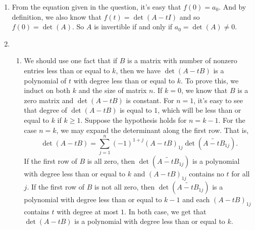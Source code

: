 \begin{enumerate}
\item From the equation given in the question, it's easy that $f(0)=a_0$. And by definition, we also know that $f(t)=\det(A-tI)$ and so $f(0)=\det(A)$. So $A$ is invertible if and only if $a_0=\det(A)\neq 0$.
\item \begin{enumerate}
\item We should use one fact that if $B$ is a matrix with number of nonzero entries less than or equal to $k$, then we have $\det(A-tB)$ is a polynomial of $t$ with degree less than or equal to $k$. To prove this, we induct on both $k$ and the size of matrix $n$. If $k=0$, we know that $B$ is a zero matrix and $\det(A-tB)$ is constant. For $n=1$, it's easy to see that degree of $\det(A-tB)$ is equal to $1$, which will be less than or equal to $k$ if $k\geq 1$. Suppose the hypothesis holds for $n=k-1$. For the case $n=k$, we may expand the determinant along the first row. That is,
\[\det(A-tB)=\sum_{j=1}^n{(-1)^{1+j}(A-tB)_{1j}\det(\tilde{A-tB}_{1j})}.\]
If the first row of $B$ is all zero, then $\det(\tilde{A-tB}_{1j})$ is a polynomial with degree less than or equal to $k$ and $(A-tB)_{1j}$ contains no $t$ for all $j$. If the first row of $B$ is not all zero, then $\det(\tilde{A-tB}_{1j})$ is a polynomial with degree less than or equal to $k-1$ and each $(A-tB)_{1j}$ contains $t$ with degree at most $1$. In both case, we get that $\det(A-tB)$ is a polynomial with degree less than or equal to $k$.


\end{enumerate}
\end{enumerate}
